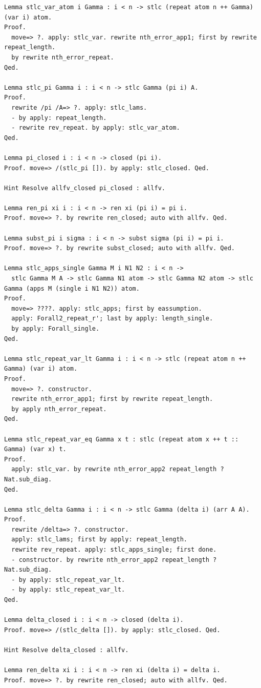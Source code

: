 \documentclass[10pt,a4paper]{amsart}
\begin{document}
\begin{lstlisting}
Lemma stlc_var_atom i Gamma : i < n -> stlc (repeat atom n ++ Gamma) (var i) atom.
Proof.
  move=> ?. apply: stlc_var. rewrite nth_error_app1; first by rewrite repeat_length.
  by rewrite nth_error_repeat.
Qed.

Lemma stlc_pi Gamma i : i < n -> stlc Gamma (pi i) A.
Proof.
  rewrite /pi /A=> ?. apply: stlc_lams.
  - by apply: repeat_length.
  - rewrite rev_repeat. by apply: stlc_var_atom.
Qed.

Lemma pi_closed i : i < n -> closed (pi i).
Proof. move=> /(stlc_pi []). by apply: stlc_closed. Qed.

Hint Resolve allfv_closed pi_closed : allfv.

Lemma ren_pi xi i : i < n -> ren xi (pi i) = pi i.
Proof. move=> ?. by rewrite ren_closed; auto with allfv. Qed.

Lemma subst_pi i sigma : i < n -> subst sigma (pi i) = pi i.
Proof. move=> ?. by rewrite subst_closed; auto with allfv. Qed.

Lemma stlc_apps_single Gamma M i N1 N2 : i < n ->
  stlc Gamma M A -> stlc Gamma N1 atom -> stlc Gamma N2 atom -> stlc Gamma (apps M (single i N1 N2)) atom.
Proof.
  move=> ????. apply: stlc_apps; first by eassumption.
  apply: Forall2_repeat_r'; last by apply: length_single.
  by apply: Forall_single.
Qed.

Lemma stlc_repeat_var_lt Gamma i : i < n -> stlc (repeat atom n ++ Gamma) (var i) atom.
Proof.
  move=> ?. constructor.
  rewrite nth_error_app1; first by rewrite repeat_length.
  by apply nth_error_repeat.
Qed.

Lemma stlc_repeat_var_eq Gamma x t : stlc (repeat atom x ++ t :: Gamma) (var x) t.
Proof.
  apply: stlc_var. by rewrite nth_error_app2 repeat_length ?Nat.sub_diag.
Qed.

Lemma stlc_delta Gamma i : i < n -> stlc Gamma (delta i) (arr A A).
Proof.
  rewrite /delta=> ?. constructor.
  apply: stlc_lams; first by apply: repeat_length.
  rewrite rev_repeat. apply: stlc_apps_single; first done.
  - constructor. by rewrite nth_error_app2 repeat_length ?Nat.sub_diag.
  - by apply: stlc_repeat_var_lt.
  - by apply: stlc_repeat_var_lt.
Qed.

Lemma delta_closed i : i < n -> closed (delta i).
Proof. move=> /(stlc_delta []). by apply: stlc_closed. Qed.

Hint Resolve delta_closed : allfv.

Lemma ren_delta xi i : i < n -> ren xi (delta i) = delta i.
Proof. move=> ?. by rewrite ren_closed; auto with allfv. Qed.


\end{lstlisting}
\end{document}

